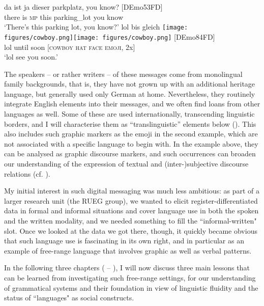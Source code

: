 \gll da     ist  ja  dieser parkplatz,   you know? \textup{[DEmo53FD]}\\
     there is  \textsc{mp} this    parking\_lot  you know\\
\glt `There’s this parking lot, you know?'
\ex
\gll lol  bis     gleich   {\db}\texttt{[image: figures/cowboy.png]}\texttt{[image: figures/cowboy.png]}       \textup{[DEmo84FD]}\\
     lol  until  soon    {[\textsc{cowboy} \textsc{hat} \textsc{face} \textsc{emoji,} 2x]}\\

\glt `lol see you soon.'
\z %
\z

The speakers – or rather writers – of these messages come from monolingual family backgrounds, that is, they have not grown up with an additional heritage language, but generally used only German at home. Nevertheless, they routinely integrate English elements into their messages, and we often find loans from other languages as well. Some of these are used internationally, transcending linguistic borders, and I will characterise them as “translinguistic” elements below (). This also includes such graphic markers as the emoji in the second example, which are not associated with a specific language to begin with. In the example above, they can be analysed as graphic discourse markers, and such occurrences can broaden our understanding of the expression of textual and (inter-)subjective discourse relations (cf. \citealt{WieseLabrenz2021}).

My initial interest in such digital messaging was much less ambitious: as part of a larger research unit (the RUEG group), we wanted to elicit register-differ\-en\-tiated data in formal and informal situations and cover language use in both the spoken and the written modality, and we needed something to fill the “informal-written" slot. Once we looked at the data we got there, though, it quickly became obvious that such language use is fascinating in its own right, and in particular as an example of free-range language that involves graphic as well as verbal patterns.

In the following three chapters ( -- ), I will now discuss three main lessons that can be learned from investigating such free-range settings, for our understanding of grammatical systems and their foundation in view of linguistic fluidity and the status of “languages" as social constructs.
